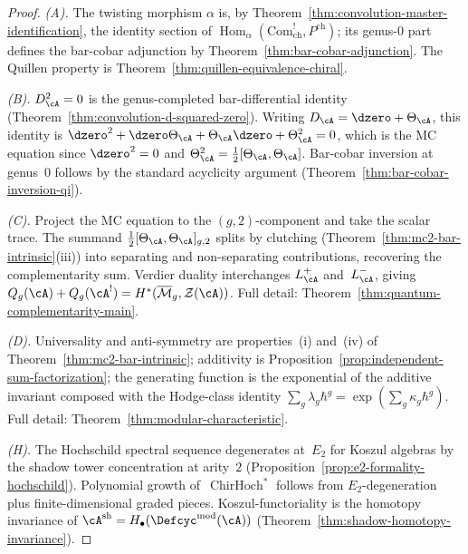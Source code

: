 \begin{proof}
\emph{(A).}
The twisting morphism $\alpha$ is, by
Theorem~\ref{thm:convolution-master-identification},
the identity section of
$\operatorname{Hom}_\alpha(\mathrm{Com}^!_{\mathrm{ch}},
P^{\mathrm{ch}})$; its genus-$0$ part defines the bar-cobar
adjunction by Theorem~\ref{thm:bar-cobar-adjunction}.
The Quillen property is
Theorem~\ref{thm:quillen-equivalence-chiral}.

\smallskip\noindent
\emph{(B).}
$D_\cA^2 = 0$ is the genus-completed bar-differential
identity
(Theorem~\ref{thm:convolution-d-squared-zero}).
Writing $D_\cA = \dzero + \Theta_\cA$, this identity is
$\dzero^2 + \dzero\Theta_\cA + \Theta_\cA \dzero
+ \Theta_\cA^2 = 0$, which is the MC equation
since $\dzero^2 = 0$ and $\Theta_\cA^2 =
\tfrac{1}{2}[\Theta_\cA, \Theta_\cA]$.
Bar-cobar inversion at genus~$0$ follows by the standard
acyclicity argument
(Theorem~\ref{thm:bar-cobar-inversion-qi}).

\smallskip\noindent
\emph{(C).}
Project the MC equation to the $(g,2)$-component
and take the scalar trace.  The summand
$\tfrac{1}{2}[\Theta_\cA,\Theta_\cA]_{g,2}$
splits by clutching
(Theorem~\ref{thm:mc2-bar-intrinsic}(iii))
into separating and non-separating contributions, recovering
the complementarity sum.  Verdier duality interchanges
$L^+_\cA$ and~$L^-_\cA$, giving $Q_g(\cA) + Q_g(\cA^!)
= H^*(\overline{\mathcal{M}}_g, \mathcal{Z}(\cA))$.
Full detail: Theorem~\ref{thm:quantum-complementarity-main}.

\smallskip\noindent
\emph{(D).}
Universality and anti-symmetry are properties~(i) and~(iv)
of Theorem~\ref{thm:mc2-bar-intrinsic}; additivity is
Proposition~\ref{prop:independent-sum-factorization};
the generating function is the exponential of the additive
invariant composed with the Hodge-class identity
$\sum_g \lambda_g \hbar^g = \exp(\sum_g \kappa_g \hbar^g)$.
Full detail: Theorem~\ref{thm:modular-characteristic}.

\smallskip\noindent
\emph{(H).}
The Hochschild spectral sequence degenerates at~$E_2$ for
Koszul algebras by the shadow tower concentration at arity~$2$
(Proposition~\ref{prop:e2-formality-hochschild}).
Polynomial growth of~$\operatorname{ChirHoch}^*$ follows
from $E_2$-degeneration plus finite-dimensional
graded pieces.  Koszul-functoriality is the homotopy
invariance of
$\cA^{\mathrm{sh}} = H_\bullet(\Defcyc^{\mathrm{mod}}(\cA))$
(Theorem~\ref{thm:shadow-homotopy-invariance}).
\end{proof}


